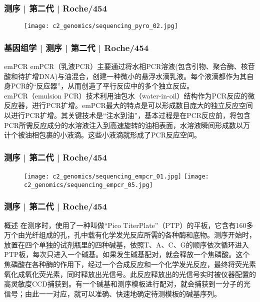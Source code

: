\begin{frame}
  \frametitle{测序 | 第二代 | Roche/454}
  \begin{figure}
    \centering
    \texttt{[image: c2\_genomics/sequencing\_pyro\_02.jpg]}
  \end{figure}
\end{frame}

\begin{frame}
  \frametitle{基因组学 | 测序 | 第二代 | Roche/454}
  \begin{block}{emPCR}
emPCR（乳液PCR）主要通过将水相PCR溶液(包含引物、聚合酶、核苷酸和待扩增DNA)与油混合，创建一种微小的悬浮水滴乳液。每个液滴都作为其自身PCR的“反应器”，从而创造了平行反应中的多个独立反应。\\
\vspace{1em}
emPCR（emulsion PCR）技术利用油包水（water-in-oil）结构作为PCR反应的微反应器，进行PCR扩增。emPCR最大的特点是可以形成数目庞大的独立反应空间以进行PCR扩增。其关键技术是“注水到油”，基本过程是在PCR反应前，将包含PCR所需反应成分的水溶液注入到高速旋转的油相表面，水溶液瞬间形成数以万计个被油相包裹的小液滴。这些小液滴就形成了PCR反应空间。
  \end{block}
\end{frame}

\begin{frame}
  \frametitle{测序 | 第二代 | Roche/454}
  \begin{figure}
    \centering
    \texttt{[image: c2\_genomics/sequencing\_empcr\_01.jpg]}
    \qquad
    \texttt{[image: c2\_genomics/sequencing\_empcr\_05.jpg]}
  \end{figure}
\end{frame}

\begin{frame}
  \frametitle{测序 | 第二代 | Roche/454}
  \begin{block}{概述}
在测序时，使用了一种叫做“Pico TiterPlate”（PTP）的平板，它含有160多万个由光纤组成的孔，孔中载有化学发光反应所需的各种酶和底物。测序开始时，放置在四个单独的试剂瓶里的四种碱基，依照T、A、C、G的顺序依次循环进入PTP板，每次只进入一个碱基。如果发生碱基配对，就会释放一个焦磷酸。这个焦磷酸在各种酶的作用下，经过一个合成反应和一个化学发光反应，最终将荧光素氧化成氧化荧光素，同时释放出光信号。此反应释放出的光信号实时被仪器配置的高灵敏度CCD捕获到。有一个碱基和测序模板进行配对，就会捕获到一分子的光信号；由此一一对应，就可以准确、快速地确定待测模板的碱基序列。
  \end{block}
\end{frame}

